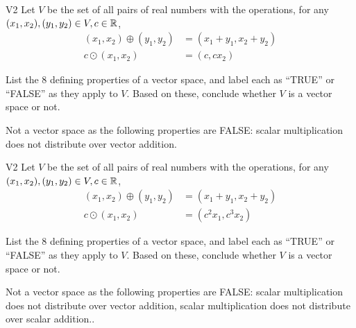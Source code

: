  \begin{problem}{V2}
 Let \(V\) be the set of all pairs of real numbers with the operations, for any \((x_1,x_2), (y_1,y_2) \in V,c \in \mathbb{R}\),
 \begin{align*}
 (x_1,x_2) \oplus (y_1,y_2) &= (x_1+y_1,x_2+y_2) \\
 c \odot (x_1,x_2) &= (c, cx_2)
 \end{align*}

   List the 8 defining properties of a vector space, and label each as
   ``TRUE'' or ``FALSE'' as they apply to \(V\). Based on these, conclude whether
   \(V\) is a vector space or not.
 \end{problem}
 \begin{solution}
 Not a vector space as the following properties are FALSE: scalar multiplication does not distribute over vector addition.
 \end{solution}
%
%
 \begin{problem}{V2}
 Let \(V\) be the set of all pairs of real numbers with the operations, for any \((x_1,x_2), (y_1,y_2) \in V,c \in \mathbb{R}\),
 \begin{align*}
 (x_1,x_2) \oplus (y_1,y_2) &= (x_1+y_1,x_2+y_2) \\
 c \odot (x_1,x_2) &= (c^2x_1, c^3x_2)
 \end{align*}

   List the 8 defining properties of a vector space, and label each as
   ``TRUE'' or ``FALSE'' as they apply to \(V\). Based on these, conclude whether
   \(V\) is a vector space or not.
 \end{problem}
 \begin{solution}
 Not a vector space as the following properties are FALSE: scalar multiplication does not distribute over vector addition, scalar multiplication does not distribute over scalar addition..
 \end{solution}
%
%
%
%
%
